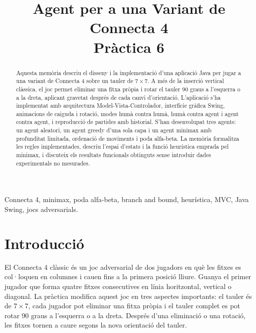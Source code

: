 \documentclass[conference,compsoc]{IEEEtran}
\begin{document}
\title{Agent per a una Variant de Connecta 4\\Pràctica 6}

\author{
}

\maketitle

\begin{strip}
\begin{abstract}
Aquesta memòria descriu el disseny i la implementació d'una aplicació Java per
jugar a una variant de Connecta 4 sobre un tauler de $7\times7$. A més de la
inserció vertical clàssica, el joc permet eliminar una fitxa pròpia i rotar el
tauler 90 graus a l'esquerra o a la dreta, aplicant gravetat després de cada
canvi d'orientació. L'aplicació s'ha implementat amb arquitectura
Model-Vista-Controlador, interfície gràfica Swing, animacions de caiguda i
rotació, modes humà contra humà, humà contra agent i agent contra agent, i
reproducció de partides amb historial. S'han desenvolupat tres agents: un agent
aleatori, un agent greedy d'una sola capa i un agent minimax amb profunditat
limitada, ordenació de moviments i poda alfa-beta. La memòria formalitza les
regles implementades, descriu l'espai d'estats i la funció heurística emprada pel
minimax, i discuteix els resultats funcionals obtinguts sense introduir dades
experimentals no mesurades.
\end{abstract}

\begin{IEEEkeywords}
Connecta 4, minimax, poda alfa-beta, branch and bound, heurística, MVC, Java
Swing, jocs adversarials.
\end{IEEEkeywords}
\end{strip}

\IEEEpeerreviewmaketitle

\section{Introducció}

El Connecta 4 clàssic és un joc adversarial de dos jugadors en què les fitxes es
col·loquen en columnes i cauen fins a la primera posició lliure. Guanya el primer
jugador que forma quatre fitxes consecutives en línia horitzontal, vertical o
diagonal. La pràctica modifica aquest joc en tres aspectes importants: el tauler
és de $7\times7$, cada jugador pot eliminar una fitxa pròpia i el tauler complet
es pot rotar 90 graus a l'esquerra o a la dreta. Després d'una eliminació o una
rotació, les fitxes tornen a caure segons la nova orientació del tauler.
\end{document}
